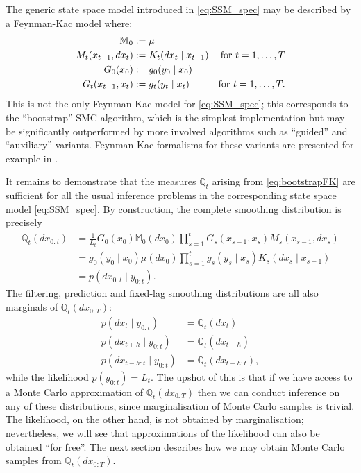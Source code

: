 The generic state space model introduced in \eqref{eq:SSM_spec} may be described by a Feynman-Kac model where:
\begin{align}
\mathbb{M}_0 &:= \mu \notag\\
M_t (x_{t-1}, dx_t) &:= K_t (dx_t \mid x_{t-1}) & \text{for } t=1,\dots,T \notag\\
G_0 (x_0) &:= g_0 ( y_0 \mid x_0 ) \notag\\
G_t (x_{t-1}, x_t) &:= g_t( y_t \mid x_t ) & \text{for } t=1,\dots,T . \label{eq:bootstrapFK}
\end{align}
This is not the only Feynman-Kac model for \eqref{eq:SSM_spec}; this corresponds to the ``bootstrap'' SMC algorithm, which is the simplest implementation but may be significantly outperformed by more involved algorithms such as ``guided''\seb{[citation]} and ``auxiliary'' \parencite{pitt1999, carpenter1999} variants. Feynman-Kac formalisms for these variants are presented for example in \textcite[Section 5.1.2]{chopin2020}.

It remains to demonstrate that the measures $\mathbb{Q}_t$ arising from \eqref{eq:bootstrapFK} are sufficient for all the usual inference problems in the corresponding state space model \eqref{eq:SSM_spec}.
By construction, the complete smoothing distribution is precisely
\begin{align*}
\mathbb{Q}_t (dx_{0:t})
&= \frac{1}{L_t} G_0(x_0) \mathbb{M}_0(dx_0)
        \prod_{s=1}^t G_s(x_{s-1}, x_s) M_s(x_{s-1}, dx_s) \\
&= g_0(y_0 \mid x_0) \mu(dx_0) 
        \prod_{s=1}^t g_s(y_s \mid x_s) K_s(dx_s \mid x_{s-1}) \\
&= p(dx_{0:t} \mid y_{0:t}) .
\end{align*}
The filtering, prediction and fixed-lag smoothing distributions are all also marginals of $\mathbb{Q}_t(dx_{0:T})$:
\begin{align*}
p(dx_t \mid y_{0:t}) &= \mathbb{Q}_t (dx_t) \\
p(dx_{t+h} \mid y_{0:t}) &= \mathbb{Q}_t (dx_{t+h}) \\
p(dx_{t-h:t} \mid y_{0:t}) &= \mathbb{Q}_t (dx_{t-h:t}) ,
\end{align*}
while the likelihood $p(y_{0:t}) = L_t$.
The upshot of this is that if we have access to a Monte Carlo approximation of $\mathbb{Q}_t(dx_{0:T})$ then we can conduct inference on any of these distributions, since marginalisation of Monte Carlo samples is trivial. The likelihood, on the other hand, is not obtained by marginalisation; nevertheless, we will see that approximations of the likelihood can also be obtained ``for free''. 
The next section describes how we may obtain Monte Carlo samples from $\mathbb{Q}_t(dx_{0:T})$.





